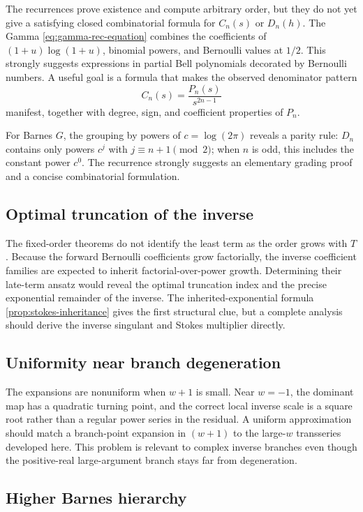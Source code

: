 \documentclass[11pt]{article}
\theoremstyle{definition}
\theoremstyle{remark}
\begin{document}
The recurrences prove existence and compute arbitrary order, but they do not yet give a satisfying closed combinatorial formula for \(C_n(s)\) or \(D_n(h)\).  The Gamma \cref{eq:gamma-rec-equation} combines the coefficients of
\((1+u)\log(1+u)\), binomial powers, and Bernoulli values at \(1/2\).  This strongly suggests expressions in partial Bell polynomials decorated by Bernoulli numbers.  A useful goal is a formula that makes the observed denominator pattern
\[
 C_n(s)=\frac{P_n(s)}{s^{2n-1}}
\]
manifest, together with degree, sign, and coefficient properties of \(P_n\).

For Barnes \(G\), the grouping by powers of \(c=\log(2\pi)\) reveals a parity rule:
\(D_n\) contains only powers \(c^j\) with \(j\equiv n+1\pmod2\); when \(n\) is odd, this includes the constant power \(c^0\).  The recurrence strongly suggests an elementary grading proof and a concise combinatorial formulation.

\subsection{Optimal truncation of the inverse}

The fixed-order theorems do not identify the least term as the order grows with \(T\).  Because the forward Bernoulli coefficients grow factorially, the inverse coefficient families are expected to inherit factorial-over-power growth.  Determining their late-term ansatz would reveal the optimal truncation index and the precise exponential remainder of the inverse.  The inherited-exponential formula \cref{prop:stokes-inheritance} gives the first structural clue, but a complete analysis should derive the inverse singulant and Stokes multiplier directly.

\subsection{Uniformity near branch degeneration}

The expansions are nonuniform when \(w+1\) is small.  Near \(w=-1\), the dominant map has a quadratic turning point, and the correct local inverse scale is a square root rather than a regular power series in the residual.  A uniform approximation should match a branch-point expansion in \((w+1)\) to the large-\(w\) transseries developed here.  This problem is relevant to complex inverse branches even though the positive-real large-argument branch stays far from degeneration.

\subsection{Higher Barnes hierarchy}
\end{document}
